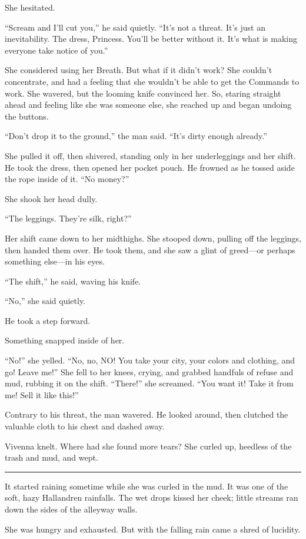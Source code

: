 She hesitated.

“Scream and I’ll cut you,” he said quietly. “It’s not a threat. It’s just an inevitability. The dress, Princess. You’ll be better without it. It’s what is making everyone take notice of you.”

She considered using her Breath. But what if it didn’t work? She couldn’t concentrate, and had a feeling that she wouldn’t be able to get the Commands to work. She wavered, but the looming knife convinced her. So, staring straight ahead and feeling like she was someone else, she reached up and began undoing the buttons.

“Don’t drop it to the ground,” the man said. “It’s dirty enough already.”

She pulled it off, then shivered, standing only in her underleggings and her shift. He took the dress, then opened her pocket pouch. He frowned as he tossed aside the rope inside of it. “No money?”

She shook her head dully.

“The leggings. They’re silk, right?”

Her shift came down to her midthighs. She stooped down, pulling off the leggings, then handed them over. He took them, and she saw a glint of greed—or perhaps something else—in his eyes.

“The shift,” he said, waving his knife.

“No,” she said quietly.

He took a step forward.

Something snapped inside of her.

“No!” she yelled. “No, no, NO! You take your city, your colors and clothing, and go! Leave me!” She fell to her knees, crying, and grabbed handfuls of refuse and mud, rubbing it on the shift. “There!” she screamed. “You want it! Take it from me! Sell it like this!”

Contrary to his threat, the man wavered. He looked around, then clutched the valuable cloth to his chest and dashed away.

Vivenna knelt. Where had she found more tears? She curled up, heedless of the trash and mud, and wept.

\bigskip \hrule \bigskip

It started raining sometime while she was curled in the mud. It was one of the soft, hazy Hallandren rainfalls. The wet drops kissed her cheek; little streams ran down the sides of the alleyway walls.

She was hungry and exhausted. But with the falling rain came a shred of lucidity.

